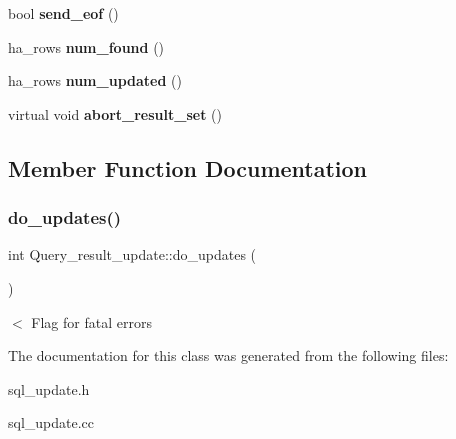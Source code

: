 \begin{DoxyCompactItemize}
\mbox{\label{classQuery__result__update_a41cc4793709fe8bfa96facec3b2de28b}} 
bool {\bfseries send\+\_\+eof} ()
\item 
\mbox{\label{classQuery__result__update_a1ca59ee38e0e5f7b2a0ed326a085d1f4}} 
ha\+\_\+rows {\bfseries num\+\_\+found} ()
\item 
\mbox{\label{classQuery__result__update_a74ec293ae9dbe760cf77ad1e91a51477}} 
ha\+\_\+rows {\bfseries num\+\_\+updated} ()
\item 
\mbox{\label{classQuery__result__update_a4906577f3ef232eb9dede0cb49803e52}} 
virtual void {\bfseries abort\+\_\+result\+\_\+set} ()
\end{DoxyCompactItemize}


\subsection{Member Function Documentation}
\mbox{\label{classQuery__result__update_a97533c9e11f7a077ae46d05d539866fe}} 
\subsubsection{\texorpdfstring{do\+\_\+updates()}{do\_updates()}}
{\footnotesize\ttfamily int Query\+\_\+result\+\_\+update\+::do\+\_\+updates (\begin{DoxyParamCaption}{ }\end{DoxyParamCaption})}

$<$ Flag for fatal errors 

The documentation for this class was generated from the following files\+:\begin{DoxyCompactItemize}
\item 
sql\+\_\+update.\+h\item 
sql\+\_\+update.\+cc\end{DoxyCompactItemize}
